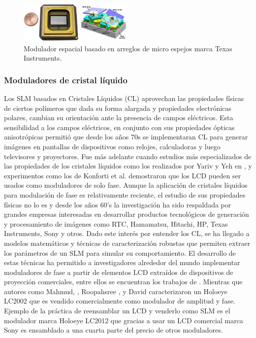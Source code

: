 \begin{figure}[h!]
\centering
    \includegraphics[width=0.5\textwidth]{MEMSLM.png}
\caption{Modulador espacial basado en arreglos de micro espejos marca Texas Instruments.}
\label{fig:MEMSLM}
\end{figure}

\subsubsection{Moduladores de cristal líquido}
Los SLM basados en Cristales Líquidos (CL) aprovechan las propiedades
físicas de ciertos polímeros que dada su forma alargada y propiedades
electrónicas polares, cambian su orientación ante la presencia de
campos eléctricos.  Esta sensibilidad a los campos eléctricos, en
conjunto con sus propiedades ópticas anisotrópicas permitió que desde
los años 70s se implementaran CL para generar imágenes en pantallas de
dispositivos como relojes, calculadoras y luego televisores y
proyectores. Fue más adelante cuando estudios más especializados de las
propiedades de los cristales líquidos como los realizados por Yariv y Yeh
en , y experimentos como los de Konforti et
al.  demostraron que los LCD pueden ser usados como
moduladores de solo fase. 
Aunque la aplicación de cristales líquidos para modulación de fase es
relativamente reciente, el estudio de sus propiedades físicas no lo es
y desde los años 60’s la investigación ha sido respaldada por grandes
empresas interesadas en desarrollar productos tecnológicos de
generación y procesamiento de imágenes como RTC, Hamamatsu, Hitachi, HP, Texas
Instruments, Sony y otros. Dado este interés por entender los CL, se
ha llegado a modelos matemáticos y  técnicas de  
caracterización robustas que permiten extraer los parámetros de un SLM para
 simular su comportamiento.
El desarrollo de estas técnicas ha permitido a investigadores 
alrededor del mundo implementar moduladores de fase a
partir de elementos LCD extraídos de dispositivos de proyección
comerciales, entre ellos se encuentran los trabajos de
. Mientras
que autores como Mahmud, , Roopahsree
, y David 
caracterizaron un Holoeye LC2002 que es vendido comercialmente como
modulador de amplitud y fase.
Ejemplo de la práctica de reensamblar un LCD y venderlo como SLM es el
modulador marca Holoeye LC2012 que gracias a usar un LCD comercial
marca Sony es ensamblado a una cuarta parte del precio de otros
moduladores. 

